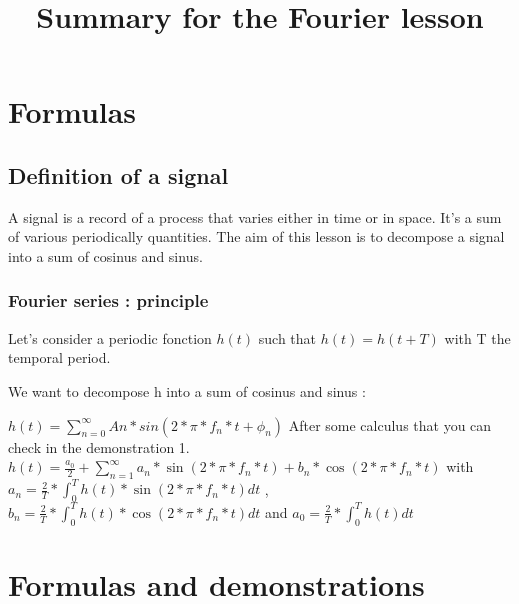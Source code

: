 \documentclass{article}
\title{Summary for the Fourier lesson }
\begin{document}
\section{Formulas}
\subsection{Definition of a signal}
A signal is a record of a process that varies either in time or in space. It's a sum of various periodically quantities. \newline
The aim of this lesson is to decompose a signal into a sum of cosinus and sinus.

\subsubsection{Fourier series : principle}
Let's consider a periodic fonction $h(t)$ such that $h(t) = h(t+T)$ with T the temporal period. \newline

We want to decompose h into a sum of cosinus and sinus : \newline

$h(t)= \sum_{n=0}^{\infty} An*sin(2*\pi*f_n*t+\phi_n)$\newline
After some calculus that you can check in the demonstration 1. \newline
$h(t) = \frac{a_0}{2} + \sum_{n=1}^{\infty} a_n*\sin(2*\pi*f_n*t) + b_n*\cos(2*\pi*f_n*t)$ \newline
with $a_n = \frac{2}{T} * \int_{0}^{T} h(t)*\sin(2*\pi*f_n*t)dt$ , $b_n = \frac{2}{T} * \int_{0}^{T} h(t)*\cos(2*\pi*f_n*t)dt$ and $a_0 =\frac{2}{T} * \int_{0}^{T} h(t)dt$


\section{Formulas and demonstrations}
\end{document}
